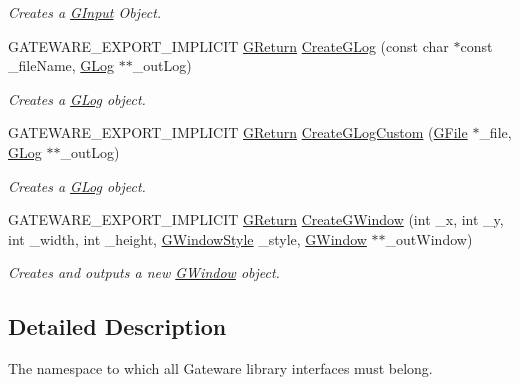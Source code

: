 \begin{DoxyCompactItemize}
\begin{DoxyCompactList}\small\item\em Creates a \mbox{\hyperlink{classGW_1_1SYSTEM_1_1GInput}{G\+Input}} Object. \end{DoxyCompactList}\item 
G\+A\+T\+E\+W\+A\+R\+E\+\_\+\+E\+X\+P\+O\+R\+T\+\_\+\+I\+M\+P\+L\+I\+C\+IT \mbox{\hyperlink{namespaceGW_a67a839e3df7ea8a5c5686613a7a3de21}{G\+Return}} \mbox{\hyperlink{namespaceGW_1_1SYSTEM_ad3886cfd0e64d8e38b62161f4d3e7496}{Create\+G\+Log}} (const char $\ast$const \+\_\+file\+Name, \mbox{\hyperlink{classGW_1_1SYSTEM_1_1GLog}{G\+Log}} $\ast$$\ast$\+\_\+out\+Log)
\begin{DoxyCompactList}\small\item\em Creates a \mbox{\hyperlink{classGW_1_1SYSTEM_1_1GLog}{G\+Log}} object. \end{DoxyCompactList}\item 
G\+A\+T\+E\+W\+A\+R\+E\+\_\+\+E\+X\+P\+O\+R\+T\+\_\+\+I\+M\+P\+L\+I\+C\+IT \mbox{\hyperlink{namespaceGW_a67a839e3df7ea8a5c5686613a7a3de21}{G\+Return}} \mbox{\hyperlink{namespaceGW_1_1SYSTEM_adc1b7d81acb493280fb43e36ef5fca56}{Create\+G\+Log\+Custom}} (\mbox{\hyperlink{classGW_1_1SYSTEM_1_1GFile}{G\+File}} $\ast$\+\_\+file, \mbox{\hyperlink{classGW_1_1SYSTEM_1_1GLog}{G\+Log}} $\ast$$\ast$\+\_\+out\+Log)
\begin{DoxyCompactList}\small\item\em Creates a \mbox{\hyperlink{classGW_1_1SYSTEM_1_1GLog}{G\+Log}} object. \end{DoxyCompactList}\item 
G\+A\+T\+E\+W\+A\+R\+E\+\_\+\+E\+X\+P\+O\+R\+T\+\_\+\+I\+M\+P\+L\+I\+C\+IT \mbox{\hyperlink{namespaceGW_a67a839e3df7ea8a5c5686613a7a3de21}{G\+Return}} \mbox{\hyperlink{namespaceGW_1_1SYSTEM_a4e046f8c5f7a2eabd19a903c9a0651f7}{Create\+G\+Window}} (int \+\_\+x, int \+\_\+y, int \+\_\+width, int \+\_\+height, \mbox{\hyperlink{namespaceGW_1_1SYSTEM_ad117891e556631f842625c348d36a071}{G\+Window\+Style}} \+\_\+style, \mbox{\hyperlink{classGW_1_1SYSTEM_1_1GWindow}{G\+Window}} $\ast$$\ast$\+\_\+out\+Window)
\begin{DoxyCompactList}\small\item\em Creates and outputs a new \mbox{\hyperlink{classGW_1_1SYSTEM_1_1GWindow}{G\+Window}} object. \end{DoxyCompactList}\end{DoxyCompactItemize}


\subsection{Detailed Description}
The namespace to which all Gateware library interfaces must belong. 

